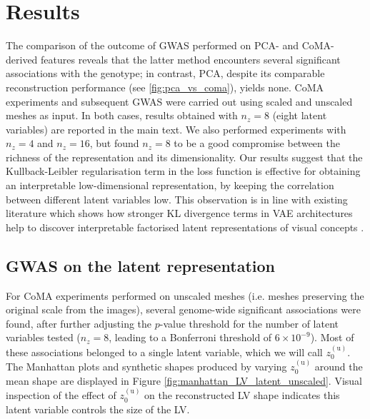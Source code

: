 \section*{Results}

The comparison of the outcome of GWAS performed on PCA- and CoMA-derived features reveals that the latter method encounters several significant associations with the genotype; in contrast, PCA, despite its comparable reconstruction performance (see \ref{fig:pca_vs_coma}), yields none. %
CoMA experiments and subsequent GWAS were carried out using scaled and unscaled meshes as input. In both cases, results obtained with $n_z=8$ (eight latent variables) are reported in the main text. We also performed experiments with $n_z=4$ and $n_z=16$, but found $n_z=8$ to be a good compromise between the richness of the representation and its dimensionality. Our results suggest that the Kullback-Leibler regularisation term in the loss function is effective for obtaining an interpretable low-dimensional representation, by keeping the correlation between different latent variables low. This observation is in line with existing literature which shows how stronger KL divergence terms in VAE architectures help to discover interpretable factorised latent representations of visual concepts \cite{ref_betavae}.


\subsection*{GWAS on the latent representation}
\label{subsec_GWAS}

For CoMA experiments performed on unscaled meshes (i.e. meshes preserving the original scale from the images), several genome-wide significant associations were found, after further adjusting the $p$-value threshold for the number of latent variables tested ($n_z=8$, leading to a Bonferroni threshold of $6\times 10^{-9}$). Most of these associations belonged to a single latent variable, which we will call $z_0^{(\text{u})}$. The Manhattan plots and synthetic shapes produced by varying $z_0^{(\text{u})}$ around the mean shape are displayed in Figure \ref{fig:manhattan_LV_latent_unscaled}. Visual inspection of the effect of $z_0^{(\text{u})}$ on the reconstructed LV shape indicates this latent variable controls the size of the LV. 

